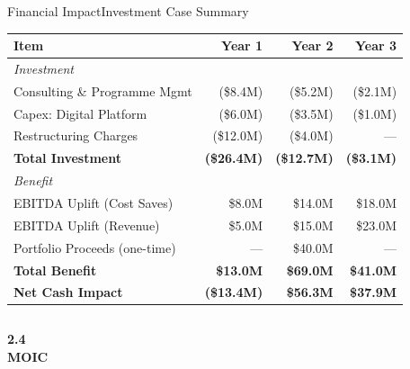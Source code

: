 \begin{frame}{Financial Impact}{Investment Case Summary}
  \vspace{0.08cm}
  \small
  \begin{center}
  \renewcommand{\arraystretch}{1.18}
  \begin{tabular}{lrrr}
    \toprule
    \rowcolor{NexaNavy}
    \textcolor{NexaWhite}{\textbf{Item}} &
    \textcolor{NexaWhite}{\textbf{Year 1}} &
    \textcolor{NexaWhite}{\textbf{Year 2}} &
    \textcolor{NexaWhite}{\textbf{Year 3}} \\
    \midrule
    \textit{Investment} & & & \\
    \rowcolor{NexaLight}
    \quad Consulting \& Programme Mgmt & (\$8.4M) & (\$5.2M) & (\$2.1M) \\
    \quad Capex: Digital Platform       & (\$6.0M) & (\$3.5M) & (\$1.0M) \\
    \rowcolor{NexaLight}
    \quad Restructuring Charges         & (\$12.0M)& (\$4.0M) & ---      \\
    \quad \textbf{Total Investment}     & \textbf{(\$26.4M)} & \textbf{(\$12.7M)} & \textbf{(\$3.1M)} \\
    \midrule
    \textit{Benefit} & & & \\
    \rowcolor{NexaLight}
    \quad EBITDA Uplift (Cost Saves)    & \$8.0M   & \$14.0M  & \$18.0M  \\
    \quad EBITDA Uplift (Revenue)       & \$5.0M   & \$15.0M  & \$23.0M  \\
    \rowcolor{NexaLight}
    \quad Portfolio Proceeds (one-time) & ---      & \$40.0M  & ---      \\
    \quad \textbf{Total Benefit}        & \textbf{\$13.0M}   & \textbf{\$69.0M}   & \textbf{\$41.0M}  \\
    \midrule
    \rowcolor{NexaTeal!20}
    \textbf{Net Cash Impact}            & \textbf{(\$13.4M)} & \textbf{\$56.3M}   & \textbf{\$37.9M}  \\
    \bottomrule
  \end{tabular}
  \end{center}
  \vspace{0.2cm}
  \begin{columns}[T]
      \begin{tcolorbox}[nexastat]
        \centering
        \textcolor{NexaGold}{\textbf{\large 2.4\texttimes{}}}\\[2pt]
        \textcolor{NexaWhite}{\small\textbf{MOIC}}\\[1pt]

\end{tcolorbox}
\end{columns}
\end{frame}
